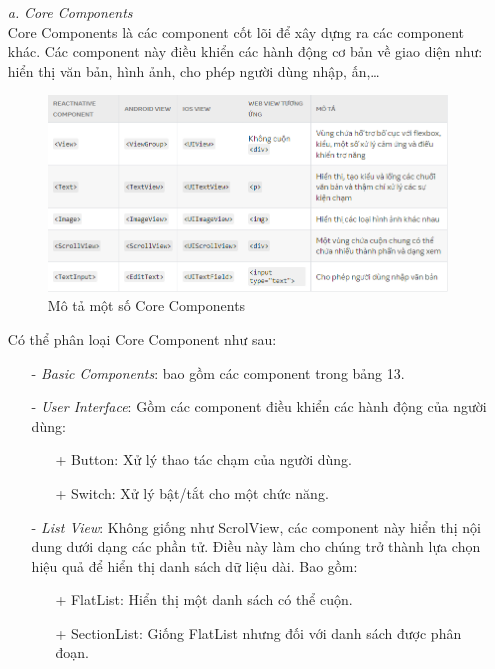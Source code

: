 \begin{enumerate}
    \item[\textit{a.}] {\textit{Core Components}}\\
    Core Components là các component cốt lõi để xây dựng ra các component khác. Các component này điều khiển các hành động cơ bản về giao diện như: hiển thị văn bản, hình ảnh, cho phép người dùng nhập, ấn,\dots\\
    \begin{figure}[!ht]
        \centering
        \includegraphics[width=1\textwidth]{images/coreComponets.png}
        \caption{Mô tả một số Core Components}
    \end{figure}
    Có thể phân loại Core Component như sau:
    \begin{enumerate}
        \item[-] {\textit{Basic Components}}: bao gồm các component trong bảng 13.
        \item[-] {\textit{User Interface}}: Gồm các component điều khiển các hành động của người dùng:
        \begin{enumerate}
            \item[+] Button: Xử lý thao tác chạm của người dùng.
            \item[+] Switch: Xử lý bật/tắt cho một chức năng.
        \end{enumerate}
        \item[-] {\textit{List View}}: Không giống như ScrolView, các component này hiển thị nội dung dưới dạng các phần tử. Điều này làm cho chúng trở thành lựa chọn hiệu quả để hiển thị danh sách dữ liệu dài. Bao gồm:
        \begin{enumerate}
            \item[+] FlatList: Hiển thị một danh sách có thể cuộn.
            \item[+] SectionList: Giống FlatList nhưng đối với danh sách được phân đoạn.

\end{enumerate}
\end{enumerate}
\end{enumerate}
